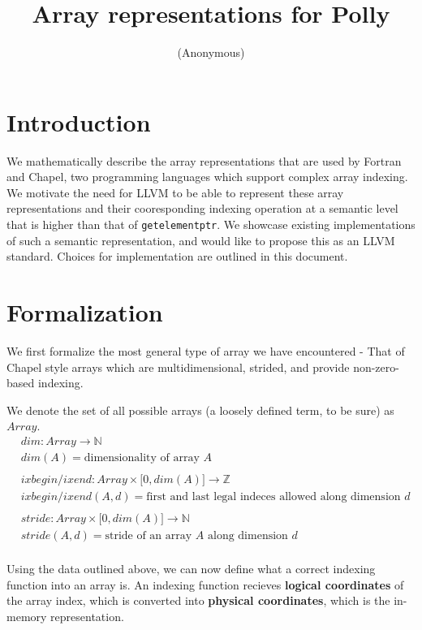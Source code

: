 \documentclass{article}
\title{Array representations for Polly}
\author{(Anonymous)}
\newcommand{\gep}{\texttt{getelementptr}}
\newcommand{\naturals}{\mathbb{N}}
\newcommand{\integers}{\mathbb{Z}}
\begin{document}
\maketitle

\newpage
\tableofcontents
\newpage

\section{Introduction}
We mathematically describe the array representations that are used by 
Fortran and Chapel, two programming languages which support complex array
indexing. We motivate the need for LLVM to be able to represent these
array representations and their cooresponding indexing operation at a
semantic level that is higher than that of \gep.
We showcase existing implementations of such a semantic representation,
and would like to propose this as an LLVM standard. Choices for
implementation are outlined in this document.

\section{Formalization}
We first formalize the most general type of array we have encountered - That
of Chapel style arrays which are multidimensional, strided, and provide
non-zero-based indexing.

We denote the set of all possible arrays (a loosely defined term, to be sure)
as $Array$.
\begin{align*}
    &dim: Array \to \naturals \\
    &dim(A) = \text{dimensionality of array $A$}
    \\
    \\
    &ixbegin/ixend: Array \times \lbrack 0, dim(A) \rbrack \to \integers \\
    &ixbegin/ixend(A, d) = \text{first and last legal indeces allowed along dimension $d$}
    \\
    \\
    &stride: Array \times \lbrack 0, dim(A) \rbrack \to \naturals \\
    &stride(A, d) = \text{stride of an array $A$ along dimension $d$} \\
\end{align*}

Using the data outlined above, we can now define what a correct indexing function
into an array is. An indexing function recieves \textbf{logical coordinates}
of the array index, which is converted into \textbf{physical coordinates},
which is the in-memory representation.
\end{document}
